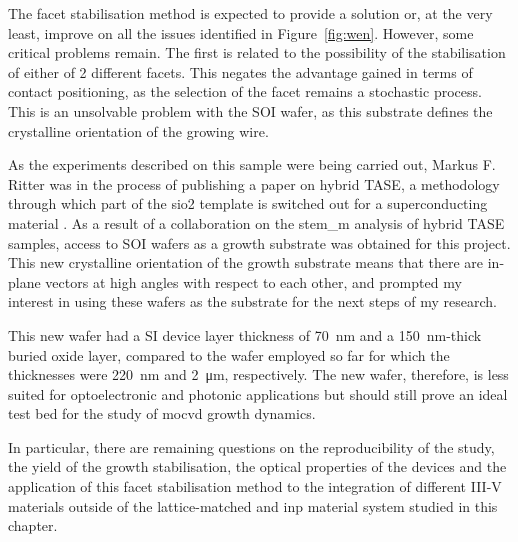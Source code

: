 The facet stabilisation method is expected to provide a solution or, at the very least, improve on all the issues identified in Figure~\ref{fig:wen}. However, some critical problems remain. The first is related to the possibility of the stabilisation of either of 2 different  facets. This negates the advantage gained in terms of contact positioning, as the selection of the  facet remains a stochastic process. This is an unsolvable problem with the \hkl[0 0 1] \acs{SOI} wafer, as this substrate defines the crystalline orientation of the growing wire. 

As the experiments described on this sample were being carried out, Markus F. Ritter was in the process of publishing a paper on hybrid \acs{TASE}, a methodology through which part of the \acs{sio2} template is switched out for a superconducting material \cite{Ritter2021}. As a result of a collaboration on the \acs{stem_m} analysis of hybrid \acs{TASE} samples, access to \hkl[1 1 0] \acs{SOI} wafers as a growth substrate was obtained for this project. This new crystalline orientation of the growth substrate means that there are in-plane  vectors at high angles with respect to each other, and prompted my interest in using these wafers as the substrate for the next steps of my research.

This new wafer had a \acl{SI} device layer thickness of \qty{70}{\nano\metre} and a \qty{150}{\nano\metre}-thick buried oxide layer, compared to the \hkl[0 0 1] wafer employed so far for which the thicknesses were \qty{220}{\nano\metre} and \qty{2}{\micro\metre}, respectively. The new wafer, therefore, is less suited for optoelectronic and photonic applications but should still prove an ideal test bed for the study of \acs{mocvd} growth dynamics.

In particular, there are remaining questions on the reproducibility of the study, the yield of the growth stabilisation, the optical properties of the devices and the application of this facet stabilisation method to the integration of different III-V materials outside of the lattice-matched  and \acs{inp} material system \cite{Pearsall1980, Sugii1983, Wagner1970} studied in this chapter.